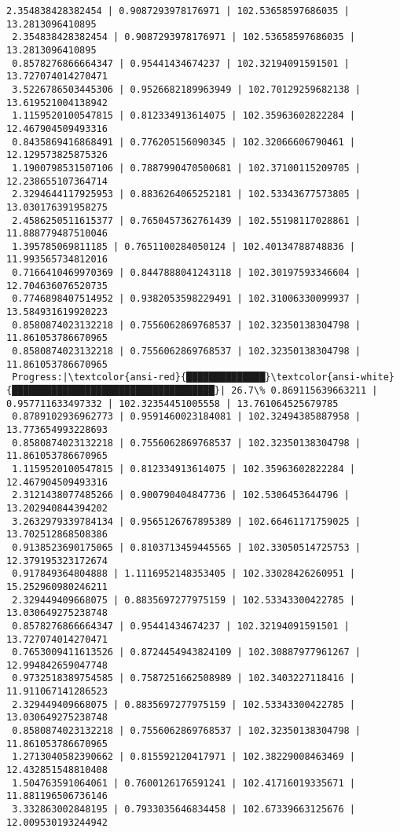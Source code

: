 \documentclass[11pt]{article}
\begin{document}
\begin{Verbatim}[commandchars=\\\{\}]
 2.354838428382454 | 0.9087293978176971 | 102.53658597686035 | 13.2813096410895
 2.354838428382454 | 0.9087293978176971 | 102.53658597686035 | 13.2813096410895
 0.8578276866664347 | 0.95441434674237 | 102.32194091591501 | 13.727074014270471
 3.5226786503445306 | 0.9526682189963949 | 102.70129259682138 | 13.619521004138942
 1.1159520100547815 | 0.812334913614075 | 102.35963602822284 | 12.467904509493316
 0.8435869416868491 | 0.776205156090345 | 102.32066606790461 | 12.129573825875326
 1.1900798531507106 | 0.7887990470500681 | 102.37100115209705 | 12.238655107364714
 2.3294644117925953 | 0.8836264065252181 | 102.53343677573805 | 13.030176391958275
 2.4586250511615377 | 0.7650457362761439 | 102.55198117028861 | 11.888779487510046
 1.395785069811185 | 0.7651100284050124 | 102.40134788748836 | 11.993565734812016
 0.7166410469970369 | 0.8447888041243118 | 102.30197593346604 | 12.704636076520735
 0.7746898407514952 | 0.9382053598229491 | 102.31006330099937 | 13.584931619920223
 0.8580874023132218 | 0.7556062869768537 | 102.32350138304798 | 11.861053786670965
 0.8580874023132218 | 0.7556062869768537 | 102.32350138304798 | 11.861053786670965
 Progress:|\textcolor{ansi-red}{██████████████}\textcolor{ansi-white}{████████████████████████████████████}| 26.7\% 0.869115639663211 | 0.957711633497332 | 102.32354451005558 | 13.761064525679785
 0.8789102936962773 | 0.9591460023184081 | 102.32494385887958 | 13.773654993228693
 0.8580874023132218 | 0.7556062869768537 | 102.32350138304798 | 11.861053786670965
 1.1159520100547815 | 0.812334913614075 | 102.35963602822284 | 12.467904509493316
 2.3121438077485266 | 0.900790404847736 | 102.5306453644796 | 13.202940844394202
 3.2632979339784134 | 0.9565126767895389 | 102.66461171759025 | 13.702512868508386
 0.9138523690175065 | 0.8103713459445565 | 102.33050514725753 | 12.379195323172674
 0.917849364804888 | 1.1116952148353405 | 102.33028426260951 | 15.252960980246211
 2.329449409668075 | 0.8835697277975159 | 102.53343300422785 | 13.030649275238748
 0.8578276866664347 | 0.95441434674237 | 102.32194091591501 | 13.727074014270471
 0.7653009411613526 | 0.8724454943824109 | 102.30887977961267 | 12.994842659047748
 0.9732518389754585 | 0.7587251662508989 | 102.3403227118416 | 11.911067141286523
 2.329449409668075 | 0.8835697277975159 | 102.53343300422785 | 13.030649275238748
 0.8580874023132218 | 0.7556062869768537 | 102.32350138304798 | 11.861053786670965
 1.2713040582390662 | 0.815592120417971 | 102.38229008463469 | 12.432851548810408
 1.504763591064061 | 0.7600126176591241 | 102.41716019335671 | 11.881196506736146
 3.332863002848195 | 0.7933035646834458 | 102.67339663125676 | 12.009530193244942

\end{Verbatim}
\end{document}
